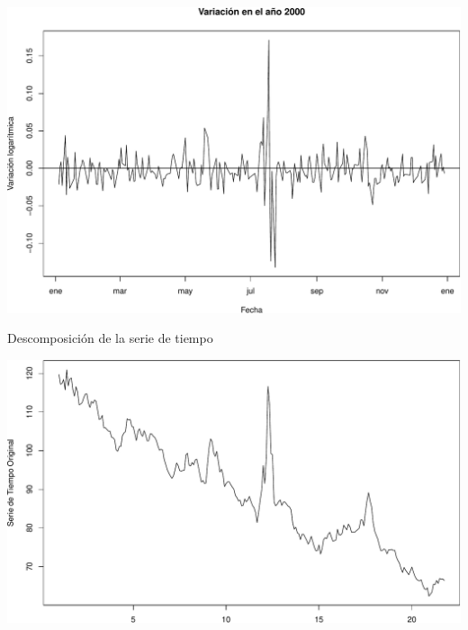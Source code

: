 \documentclass[
  10pt,
  ignorenonframetext,
  aspectratio=1612]{beamer}
\newenvironment{Shaded}{\begin{snugshade}}{\end{snugshade}}
\newcommand{\AttributeTok}[1]{\textcolor[rgb]{0.13,0.29,0.53}{#1}}
\newcommand{\FunctionTok}[1]{\textcolor[rgb]{0.13,0.29,0.53}{\textbf{#1}}}
\newcommand{\NormalTok}[1]{#1}
\newcommand{\OtherTok}[1]{\textcolor[rgb]{0.56,0.35,0.01}{#1}}
\newcommand{\SpecialCharTok}[1]{\textcolor[rgb]{0.81,0.36,0.00}{\textbf{#1}}}
\newcommand{\StringTok}[1]{\textcolor[rgb]{0.31,0.60,0.02}{#1}}
\begin{document}
\begin{frame}{}
\label{section-1}
\includegraphics{Informe_files/figure-beamer/unnamed-chunk-9-1.pdf}
\end{frame}

\begin{frame}[fragile]{Descomposición de la serie de tiempo}
\label{descomposiciuxf3n-de-la-serie-de-tiempo}
\begin{Shaded}
\end{Shaded}

\includegraphics{Informe_files/figure-beamer/unnamed-chunk-10-1.pdf}
\end{frame}
\end{document}

